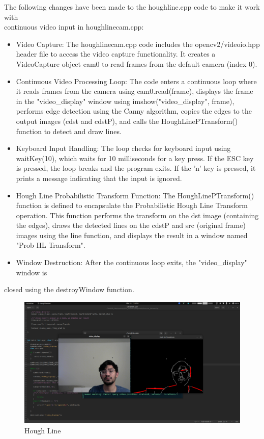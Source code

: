 \documentclass[a4paper,11pt]{article}%
\newenvironment{qanda}{\setlength{\parindent}{0pt}}{\bigskip}
\begin{document}
\begin{qanda}
\begin{enumerate}
The following changes have been made to the houghline.cpp code to make it work with\\
continuous video input in houghlinecam.cpp:
\begin{itemize}
	\item Video Capture: The houghlinecam.cpp code includes the opencv2/videoio.hpp header
	file to access the video capture functionality. It creates a VideoCapture object cam0 to
	read frames from the default camera (index 0).
	\item Continuous Video Processing Loop: The code enters a continuous loop where it reads
	frames from the camera using cam0.read(frame), displays the frame in the
	"video\_display" window using imshow("video\_display", frame), performs edge detection using the Canny algorithm, copies the edges to the output images (cdst and cdstP), and
	calls the HoughLinePTransform() function to detect and draw lines.
	\item Keyboard Input Handling: The loop checks for keyboard input using waitKey(10), which
	waits for 10 milliseconds for a key press. If the ESC key is pressed, the loop breaks and
	the program exits. If the 'n' key is pressed, it prints a message indicating that the input is
	ignored.
	\item Hough Line Probabilistic Transform Function: The HoughLinePTransform() function is
	defined to encapsulate the Probabilistic Hough Line Transform operation. This function
	performs the transform on the dst image (containing the edges), draws the detected lines
	on the cdstP and src (original frame) images using the line function, and displays the
	result in a window named "Prob HL Transform".
	\item Window Destruction: After the continuous loop exits, the "video\_display" window is
\end{itemize}


closed using the destroyWindow function.
\begin{figure}[H]
	\centering
	\includegraphics[scale=0.25]{figures/houghline.png}
	\caption{Hough Line}
\end{figure}


\end{enumerate}
\end{qanda}
\end{document}
